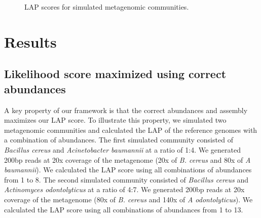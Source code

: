 \documentclass[conference]{IEEEtran}
\begin{document}
\begin{figure}[tbhp!]
\centering
\label{fig:ref_abun}

\hfil
{}

\centering \caption{LAP scores for simulated metagenomic communities.}
\end{figure}

\section{Results}
\subsection{Likelihood score maximized using correct abundances}
A key property of our framework is that the correct abundances and assembly maximizes our LAP score.
To illustrate this property, we simulated two metagenomic communities and calculated the LAP of the reference genomes with a combination of abundances.
The first simulated community consisted of \emph{Bacillus cereus} and \emph{Acinetobacter baumannii} at a ratio of 1:4.
We generated 200bp reads at 20x coverage of the metagenome (20x of \emph{B. cereus} and 80x of \emph{A baumannii}).
We calculated the LAP score using all combinations of abundances from 1 to 8.
The second simulated community consisted of \emph{Bacillus cereus} and \emph{Actinomyces odontolyticus} at a ratio of 4:7.
We generated 200bp reads at 20x coverage of the metagenome (80x of \emph{B. cereus} and 140x of \emph{A odontolyticus}).
We calculated the LAP score using all combinations of abundances from 1 to 13.
\end{document}
